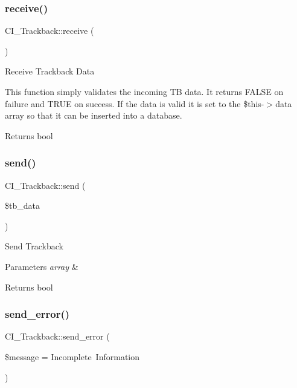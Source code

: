 \subsubsection{\texorpdfstring{receive()}{receive()}}
{\footnotesize\ttfamily C\+I\+\_\+\+Trackback\+::receive (\begin{DoxyParamCaption}{ }\end{DoxyParamCaption})}

Receive Trackback Data

This function simply validates the incoming TB data. It returns F\+A\+L\+SE on failure and T\+R\+UE on success. If the data is valid it is set to the \$this-\/$>$data array so that it can be inserted into a database.

\begin{DoxyReturn}{Returns}
bool 
\end{DoxyReturn}
\mbox{\label{class_c_i___trackback_a53a7142a0e7dd1ad08467f8320883cf9}} 
\subsubsection{\texorpdfstring{send()}{send()}}
{\footnotesize\ttfamily C\+I\+\_\+\+Trackback\+::send (\begin{DoxyParamCaption}\item[{}]{\$tb\+\_\+data }\end{DoxyParamCaption})}

Send Trackback


\begin{DoxyParams}{Parameters}
{\em array} & \\
\hline
\end{DoxyParams}
\begin{DoxyReturn}{Returns}
bool 
\end{DoxyReturn}
\mbox{\label{class_c_i___trackback_af67e8ed261b4a2a3482a92ebaf67bb60}} 
\subsubsection{\texorpdfstring{send\+\_\+error()}{send\_error()}}
{\footnotesize\ttfamily C\+I\+\_\+\+Trackback\+::send\+\_\+error (\begin{DoxyParamCaption}\item[{}]{\$message = {\ttfamily \textquotesingle{}Incomplete~Information\textquotesingle{}} }\end{DoxyParamCaption})}

